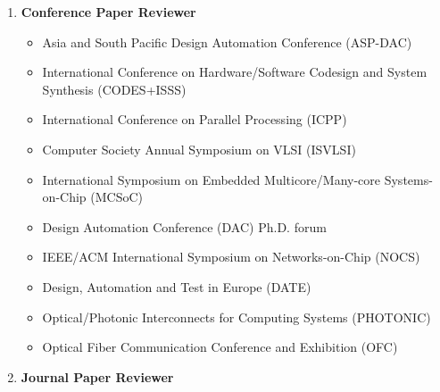 \documentclass{mycv}
\begin{document}
\begin{enumerate}[label={}]
  \item \textbf{Conference Paper Reviewer}
  \begin{itemize}
	\item Asia and South Pacific Design Automation Conference (ASP-DAC)
	\item International Conference on Hardware/Software Codesign and System
	Synthesis (CODES+ISSS)
	\item International Conference on Parallel Processing (ICPP)
	\item Computer Society Annual Symposium on VLSI (ISVLSI)
	\item International Symposium on Embedded Multicore/Many-core Systems-on-Chip (MCSoC)
	\item Design Automation Conference (DAC) Ph.D. forum
	\item IEEE/ACM International Symposium on Networks-on-Chip (NOCS)
	\item Design, Automation and Test in Europe (DATE)
	\item Optical/Photonic Interconnects for Computing Systems (PHOTONIC)
	\item Optical Fiber Communication Conference and Exhibition (OFC)
  \end{itemize}
  \item \textbf{Journal Paper Reviewer}

\end{enumerate}
\end{document}
